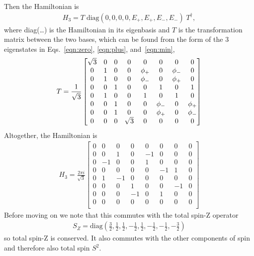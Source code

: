 Then the Hamiltonian is 
\begin{align}
H_3 = T\; \text{diag}(0,0,0,0,E_+,E_+,E_-,E_-)\; T^\dag,
\end{align}
where diag(\dots) is the Hamiltonian in its eigenbasis and $T$ is the transformation matrix between the two bases, which can be found from the form of the 3 eigenstates in Eqs.~\ref{eqn:zero}, \ref{eqn:plus}, and~\ref{eqn:min},
\begin{align}
T = \frac{1}{\sqrt{3}}\begin{bmatrix}
\sqrt{3} & 0 & 0 & 0        & 0      & 0      & 0      & 0      \\
0        & 1 & 0 & 0        & \phi_+ & 0      & \phi_- & 0      \\
0        & 1 & 0 & 0        & \phi_- & 0      & \phi_+ & 0      \\
0        & 0 & 1 & 0        & 0      & 1      & 0      & 1      \\
0        & 1 & 0 & 0        & 1      & 0      & 1      & 0      \\
0        & 0 & 1 & 0        & 0      & \phi_- & 0      & \phi_+ \\
0        & 0 & 1 & 0        & 0      & \phi_+ & 0      & \phi_- \\
0        & 0 & 0 & \sqrt{3} & 0      & 0      & 0      & 0
\end{bmatrix}
\end{align}
Altogether, the Hamiltonian is
\begin{align}
H_3 = \frac{2\pi i}{\sqrt{3}}\begin{bmatrix}
0 & 0  & 0  & 0  & 0  & 0  & 0  & 0 \\
0 & 0  & 1  & 0  & -1 & 0  & 0  & 0 \\
0 & -1 & 0  & 0  & 1  & 0  & 0  & 0 \\
0 & 0  & 0  & 0  & 0  & -1 & 1  & 0 \\
0 & 1  & -1 & 0  & 0  & 0  & 0  & 0 \\
0 & 0  & 0  & 1  & 0  & 0  & -1 & 0 \\
0 & 0  & 0  & -1 & 0  & 1  & 0  & 0 \\
0 & 0  & 0  & 0  & 0  & 0  & 0  & 0 \\
\end{bmatrix}\label{eqn:3ham}
\end{align}
Before moving on we note that this commutes with the total spin-Z operator 
\begin{align}
S_Z = \text{diag}(\frac{3}{2}, \frac{1}{2}, \frac{1}{2}, -\frac{1}{2}, \frac{1}{2}, -\frac{1}{2}, -\frac{1}{2}, -\frac{3}{2})
\end{align}
so total spin-Z is conserved. It also commutes with the other components of spin and therefore also total spin $S^2$.

